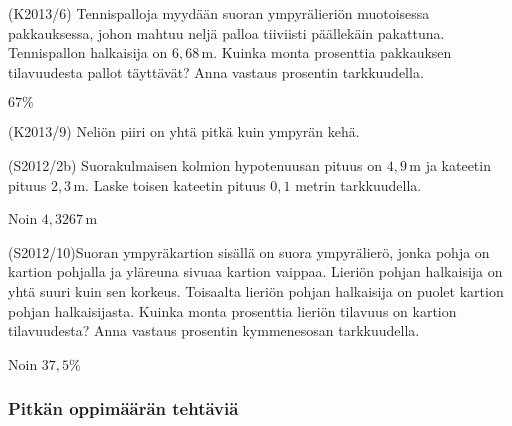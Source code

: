 \begin{tehtava}
(K2013/6) Tennispalloja myydään suoran ympyrälieriön muotoisessa pakkauksessa, johon mahtuu neljä palloa tiiviisti päällekäin pakattuna. Tennispallon halkaisija on $6,68$\,m. Kuinka monta prosenttia pakkauksen tilavuudesta pallot täyttävät? Anna vastaus prosentin tarkkuudella.
  \begin{vastaus}
  $67\%$
  \end{vastaus}
\end{tehtava}

\begin{tehtava}(K2013/9) Neliön piiri on yhtä pitkä kuin ympyrän kehä.
    \begin{vastaus}
 \end{vastaus}
\end{tehtava}

\begin{tehtava}
(S2012/2b) Suorakulmaisen kolmion hypotenuusan pituus on $4,9$\,m ja kateetin pituus $2,3$\,m. Laske toisen kateetin pituus $0,1$ metrin tarkkuudella.
  \begin{vastaus}
  Noin $4,3267$\,m
  \end{vastaus}
\end{tehtava}

\begin{tehtava}
(S2012/10)Suoran ympyräkartion sisällä on suora ympyrälierö, jonka pohja on kartion pohjalla ja yläreuna sivuaa kartion vaippaa. Lieriön pohjan halkaisija on yhtä suuri kuin sen korkeus. Toisaalta lieriön pohjan halkaisija on puolet kartion pohjan halkaisijasta. Kuinka monta prosenttia lieriön tilavuus on kartion tilavuudesta? Anna vastaus prosentin kymmenesosan tarkkuudella.
  \begin{vastaus}
  Noin $37,5\%$
  \end{vastaus}
\end{tehtava}


\subsubsection*{Pitkän oppimäärän tehtäviä}

